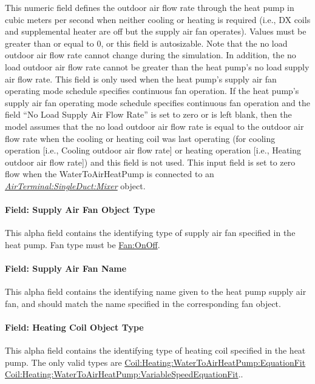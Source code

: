 This numeric field defines the outdoor air flow rate through the heat pump in cubic meters per second when neither cooling or heating is required (i.e., DX coils and supplemental heater are off but the supply air fan operates). Values must be greater than or equal to 0, or this field is autosizable. Note that the no load outdoor air flow rate cannot change during the simulation. In addition, the no load outdoor air flow rate cannot be greater than the heat pump's no load supply air flow rate. This field is only used when the heat pump's supply air fan operating mode schedule specifies continuous fan operation. If the heat pump's supply air fan operating mode schedule specifies continuous fan operation and the field ``No Load Supply Air Flow Rate'' is set to zero or is left blank, then the model assumes that the no load outdoor air flow rate is equal to the outdoor air flow rate when the cooling or heating coil was last operating (for cooling operation {[}i.e., Cooling outdoor air flow rate{]} or heating operation {[}i.e., Heating outdoor air flow rate{]}) and this field is not used. This input field is set to zero flow when the WaterToAirHeatPump is connected to an \textit{\hyperref[airterminalsingleductmixer]{AirTerminal:SingleDuct:Mixer}} object.

\paragraph{Field: Supply Air Fan Object Type}\label{field-supply-air-fan-object-type-7}

This alpha field contains the identifying type of supply air fan specified in the heat pump. Fan type must be \hyperref[fanonoff]{Fan:OnOff}.

\paragraph{Field: Supply Air Fan Name}\label{field-supply-air-fan-name-6}

This alpha field contains the identifying name given to the heat pump supply air fan, and should match the name specified in the corresponding fan object.

\paragraph{Field: Heating Coil Object Type}\label{field-heating-coil-object-type-5-000}

This alpha field contains the identifying type of heating coil specified in the heat pump. The only valid types are \hyperref[coilheatingwatertoairheatpumpequationfit]{Coil:Heating:WaterToAirHeatPump:EquationFit} \hyperref[coilheatingwatertoairheatpumpvariablespeedequationfit]{Coil:Heating:WaterToAirHeat\hyperref[pumpvariablespeed]{Pump:VariableSpeed}EquationFit}..

